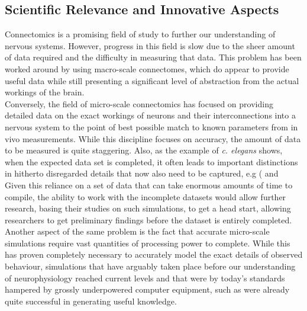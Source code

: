 \documentclass[a4paper,11pt]{article}
\begin{document}
\subsection{Scientific Relevance and Innovative Aspects}
Connectomics is a promising field of study to further our understanding of nervous systems. However, progress in this field is slow due to the sheer amount of data required and the difficulty in measuring that data. This problem has been worked around by using macro-scale connectomes, which do appear to provide useful data while still presenting a significant level of abstraction from the actual workings of the brain.  
\\[0,2cm]
Conversely, the field of micro-scale connectomics has focused on providing detailed data on the exact workings of neurons and their interconnections into a nervous system to the point of best possible match to known parameters from in vivo measurements. While this discipline focuses on accuracy, the amount of data to be measured is quite staggering. Also, as the example of \emph{c. elegans} shows, when the expected data set is completed, it often leads to important distinctions in hitherto disregarded details that now also need to be captured, e.g  (\citep{Bargmann2012} and \citep{Izquierdo2013}   \\[0,2cm]
Given this reliance on a set of data that can take enormous amounts of time to compile, the ability to work with the incomplete datasets would allow further research, basing their studies on such simulations, to get a head start, allowing researchers to get preliminary findings before the dataset is entirely completed. \\[0,2cm]
Another aspect of the same problem is the fact that accurate micro-scale simulations require vast quantities of processing power to complete. While this has proven completely necessary to accurately model the exact details of observed behaviour, simulations that have arguably taken place before our understanding of neurophysiology reached current levels and that were by today's standards hampered by grossly underpowered computer equipment, such as \citep{Kimura2005} were already quite successful in generating useful knowledge.  
\end{document}
